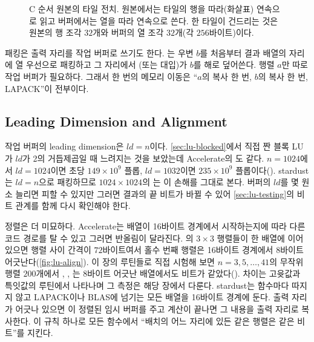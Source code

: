 \begin{figure}[htbp]
\centering
{}
\caption{C 순서 원본의 타일 전치. 원본에서는 타일의 행을 따라(화살표) 연속으로 읽고 버퍼에서는 열을 따라 연속으로 쓴다. 한 타일이 건드리는 것은 원본의 행 조각 $32$개와 버퍼의 열 조각 $32$개(각 $256$바이트)이다.}
\label{fig:lu-tile}
\end{figure}

패킹은 출력 자리를 작업 버퍼로 쓰기도 한다. 는 우변 $b$를 처음부터 결과 배열의 자리에 열 우선으로 패킹하고 그 자리에서 (또는 대입)가 $b$를 해로 덮어쓴다. 행렬 $a$만 따로 작업 버퍼가 필요하다. 그래서  한 번의 메모리 이동은 ``$a$의 복사 한 번, $b$의 복사 한 번, LAPACK''이 전부이다.

\subsection{Leading Dimension and Alignment}

작업 버퍼의 leading dimension은 $\mathit{ld}=n$이다. \cref{sec:lu-blocked}에서 직접 짠 블록 LU가 $\mathit{ld}$가 2의 거듭제곱일 때 느려지는 것을 보았는데 Accelerate의 도 같다. $n=1024$에서 $\mathit{ld}=1024$이면 초당 $149\times10^9$ 플롭, $\mathit{ld}=1032$이면 $235\times10^9$ 플롭이다(). stardust는 $\mathit{ld}=n$으로 패킹하므로 $1024\times1024$의 는 이 손해를 그대로 본다. 버퍼의 $\mathit{ld}$를 몇 원소 늘리면 피할 수 있지만 그러면 결과의 끝 비트가 바뀔 수 있어 \cref{sec:lu-testing}의 비트 관계를 함께 다시 확인해야 한다.

정렬은 더 미묘하다. Accelerate는 배열이 16바이트 경계에서 시작하는지에 따라 다른 코드 경로를 탈 수 있고 그러면 반올림이 달라진다. 의 $3\times3$ 행렬들이 한 배열에 이어 있으면 행렬 사이 간격이 $72$바이트여서 홀수 번째 행렬은 16바이트 경계에서 8바이트 어긋난다(\cref{fig:lu-align}). 이 장의 루틴들로 직접 시험해 보면 $n=3,5,\dots,41$의 무작위 행렬 $200$개에서 , , 는 8바이트 어긋난 배열에서도 비트가 같았다(). 차이는 고윳값과 특잇값의 루틴에서 나타나며 그 측정은 해당 장에서 다룬다. stardust는 함수마다 따지지 않고 LAPACK이나 BLAS에 넘기는 모든 배열을 16바이트 경계에 둔다. 출력 자리가 어긋나 있으면 이 정렬된 임시 버퍼를 주고 계산이 끝나면 그 내용을 출력 자리로 복사한다. 이 규칙 하나로 모든 함수에서 ``배치의 어느 자리에 있든 같은 행렬은 같은 비트''를 지킨다.

